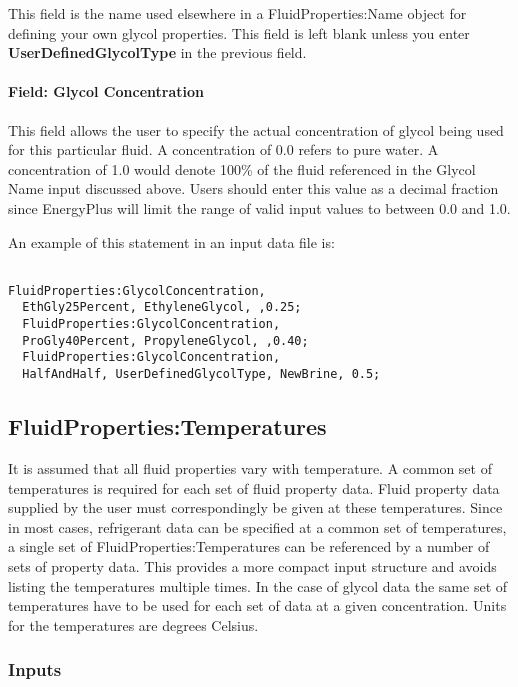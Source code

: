 This field is the name used elsewhere in a FluidProperties:Name object for defining your own glycol properties. This field is left blank unless you enter \textbf{UserDefinedGlycolType} in the previous field.

\paragraph{Field: Glycol Concentration}\label{field-glycol-concentration}

This field allows the user to specify the actual concentration of glycol being used for this particular fluid. A concentration of 0.0 refers to pure water. A concentration of 1.0 would denote 100\% of the fluid referenced in the Glycol Name input discussed above. Users should enter this value as a decimal fraction since EnergyPlus will limit the range of valid input values to between 0.0 and 1.0.

An example of this statement in an input data file is:

\begin{lstlisting}

FluidProperties:GlycolConcentration,
  EthGly25Percent, EthyleneGlycol, ,0.25;
  FluidProperties:GlycolConcentration,
  ProGly40Percent, PropyleneGlycol, ,0.40;
  FluidProperties:GlycolConcentration,
  HalfAndHalf, UserDefinedGlycolType, NewBrine, 0.5;
\end{lstlisting}

\subsection{FluidProperties:Temperatures}\label{fluidpropertiestemperatures}

It is assumed that all fluid properties vary with temperature. A common set of temperatures is required for each set of fluid property data. Fluid property data supplied by the user must correspondingly be given at these temperatures. Since in most cases, refrigerant data can be specified at a common set of temperatures, a single set of FluidProperties:Temperatures can be referenced by a number of sets of property data. This provides a more compact input structure and avoids listing the temperatures multiple times. In the case of glycol data the same set of temperatures have to be used for each set of data at a given concentration. Units for the temperatures are degrees Celsius.

\subsubsection{Inputs}\label{inputs-2-017}

